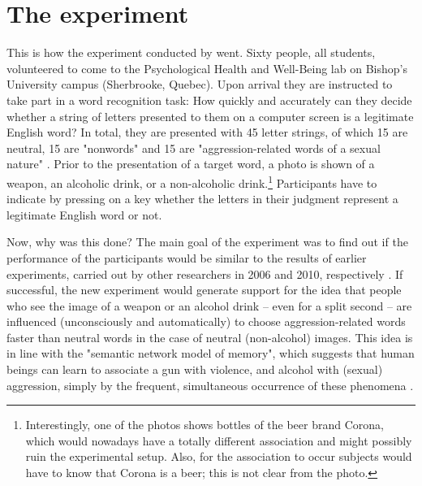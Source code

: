 \documentclass[twocolumn, serif, authordate, reflection]{jote-article}
\begin{document}
{}
\section*{The experiment}



This is how the experiment conducted by \textcite{Leboeuf2020} went. Sixty people, all students, volunteered to come to the Psychological Health and Well-Being lab on Bishop’s University campus (Sherbrooke, Quebec). Upon arrival they are instructed to take part in a word recognition task: How quickly and accurately can they decide whether a string of letters presented to them on a computer screen is a legitimate English word? In total, they are presented with 45 letter strings, of which 15 are neutral, 15 are "nonwords" and 15 are "aggression-related words of a sexual nature" \parencite[p. 10]{Leboeuf2020}. Prior to the presentation of a target word, a photo is shown of a weapon, an alcoholic drink, or a non-alcoholic drink.\footnote{Interestingly, one of the photos shows bottles of the beer brand Corona, which would nowadays have a totally different association and might possibly ruin the experimental setup. Also, for the association to occur subjects would have to know that Corona is a beer; this is not clear from the photo.} Participants have to indicate by pressing on a key whether the letters in their judgment represent a legitimate English word or not. 

Now, why was this done? The main goal of the experiment was to find out if the performance of the participants would be similar to the results of earlier experiments, carried out by other researchers in 2006 and 2010, respectively \parencite{Bartholow2006,Begue2012}. If successful, the new experiment would generate support for the idea that people who see the image of a weapon or an alcohol drink – even for a split second – are influenced (unconsciously and automatically) to choose aggression-related words faster than neutral words in the case of neutral (non-alcohol) images. This idea is in line with the "semantic network model of memory", which suggests that human beings can learn to associate a gun with violence, and alcohol with (sexual) aggression, simply by the frequent, simultaneous occurrence of these phenomena \parencite{Leboeuf2020}.
\end{document}
